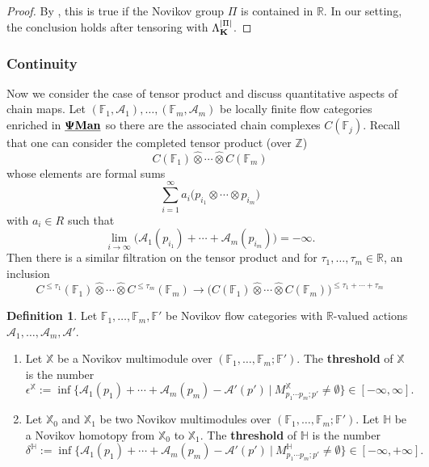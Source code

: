 \documentclass[reqno, 10pt]{amsart}
\numberwithin{equation}{section}
\numberwithin{equation}{section}
\theoremstyle{definition}
\newtheorem{defn}[thm]{Definition}
\theoremstyle{remark}
\newcommand{\beqn}{\begin{equation*}}
\newcommand{\eeqn}{\end{equation*}}
\newcommand{\mb}{\mathbb}
\newcommand{\mc}{\mathcal}
\newcommand{\pman}{\uds{{\bf \Psi}{\bf Man}}}
\newcommand{\uds}[1]{\underline{\smash{#1}}}
\begin{document}
\begin{proof}
By \cite[Theorem A, B]{Usher_Zhang_2016}, this is true if the Novikov group $\Pi$ is contained in ${\mb R}$. In our setting, the conclusion holds after tensoring with $\Lambda_{\bf K}^{|\Pi|}$.
\end{proof}



















\subsubsection{Continuity}

Now we consider the case of tensor product and discuss quantitative aspects of chain maps. Let $({\mb F}_1, {\mc A}_1), \ldots, ({\mb F}_m, {\mc A}_m)$ be locally finite flow categories enriched in $\pman$ so there are the associated chain complexes $C ({\mb F}_j)$. Recall that one can consider the completed tensor product (over ${\mb Z}$)
\beqn
C ({\mb F}_1) \widehat{\otimes} \cdots \widehat{\otimes} C ({\mb F}_m)
\eeqn
whose elements are formal sums
\beqn
\sum_{i=1}^\infty a_i \big( p_{i_1} \otimes \cdots \otimes p_{i_m}\big)
\eeqn
with $a_i \in R$ such that 
\beqn
\lim_{i \to \infty} \big( {\mc A}_1(p_{i_1}) + \cdots + {\mc A}_m( p_{i_m}) \big) = -\infty.
\eeqn
Then there is a similar filtration on the tensor product and for $\tau_1, \ldots, \tau_m \in {\mb R}$, an inclusion
\beqn
C^{\leq \tau_1}({\mb F}_1) \widehat{\otimes} \cdots \widehat{\otimes} C^{\leq \tau_m}({\mb F}_m) \to \big( C({\mb F}_1) \widehat{\otimes} \cdots \widehat{\otimes} C ({\mb F}_m )\big)^{\leq \tau_1 + \cdots + \tau_m}
\eeqn


\begin{defn}\label{defn_threshold}
Let ${\mb F}_1, \ldots, {\mb F}_m, {\mb F}'$ be Novikov flow categories with ${\mb R}$-valued actions ${\mc A}_1, \ldots, {\mc A}_m, {\mc A}'$. 

\begin{enumerate}

\item Let ${\mb X}$ be a Novikov multimodule over $({\mb F}_1, \ldots, {\mb F}_m; {\mb F}')$. The {\bf threshold} of ${\mb X}$ is the number
\beqn
\epsilon^{\mb X}:= \inf \Big\{ {\mc A}_1 (p_1) + \cdots + {\mc A}_m(p_m) - {\mc A}' (p')\ |\ M_{p_1 \cdots p_m; p'}^{\mb X}  \neq \emptyset \Big\} \in [-\infty, \infty].
\eeqn

\item Let ${\mb X}_0$ and ${\mb X}_1$ be two Novikov multimodules over $({\mb F}_1, \ldots, {\mb F}_m; {\mb F}')$. Let ${\mb H}$ be a Novikov homotopy from ${\mb X}_0$ to ${\mb X}_1$. The {\bf threshold} of ${\mb H}$ is the number
\beqn
\delta^{\mb H}:= \inf \Big\{ {\mc A}_1(p_1) + \cdots + {\mc A}_m (p_m) - {\mc A}'(p') \ |\ M_{p_1 \cdots p_m; p'}^{\mb H} \neq \emptyset \Big\} \in [-\infty, +\infty].
\eeqn
\end{enumerate}
\end{defn}
\end{document}
